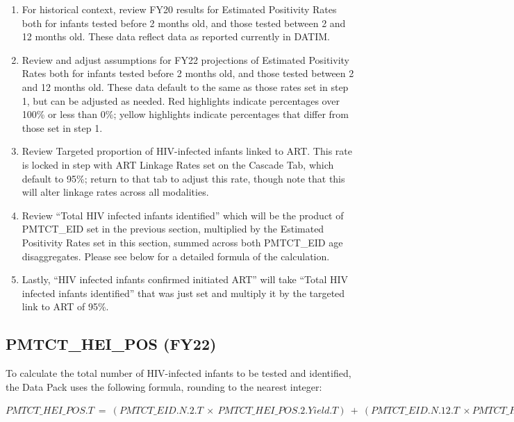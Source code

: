 \documentclass[
  openany]{book}
\begin{document}
\begin{enumerate}
\def\labelenumi{\arabic{enumi}.}
\item
  For historical context, review FY20 results for Estimated Positivity
  Rates both for infants tested before 2 months old, and those tested
  between 2 and 12 months old. These data reflect data as reported
  currently in DATIM.
\item
  Review and adjust assumptions for FY22 projections of Estimated
  Positivity Rates both for infants tested before 2 months old, and
  those tested between 2 and 12 months old. These data default to the
  same as those rates set in step 1, but can be adjusted as needed.
  Red highlights indicate percentages over 100\% or less than 0\%;
  yellow highlights indicate percentages that differ from those set in
  step 1.
\item
  Review Targeted proportion of HIV-infected infants linked to ART.
  This rate is locked in step with ART Linkage Rates set on the
  Cascade Tab, which default to 95\%; return to that tab to adjust this
  rate, though note that this will alter linkage rates across all
  modalities.
\item
  Review ``Total HIV infected infants identified'' which will be the
  product of PMTCT\_EID set in the previous section, multiplied by the
  Estimated Positivity Rates set in this section, summed across both
  PMTCT\_EID age disaggregates. Please see below for a detailed formula
  of the calculation.
\item
  Lastly, ``HIV infected infants confirmed initiated ART'' will take
  ``Total HIV infected infants identified'' that was just set and
  multiply it by the targeted link to ART of 95\%.
\end{enumerate}

\hypertarget{pmtct_hei_pos-fy22}{%
\subsection{PMTCT\_HEI\_POS (FY22)}\label{pmtct_hei_pos-fy22}}

To calculate the total number of HIV-infected infants to be tested and
identified, the Data Pack uses the following formula, rounding to the
nearest integer:

\begin{center} $PMTCT\_ HEI\_ POS.T\  = \ (PMTCT\_ EID.N.2.T\  \times \ PMTCT\_ HEI\_ POS.2.Yield.T)\  + \ (PMTCT\_ EID.N.12.T\  \times PMTCT\_ HEI\_ POS.12.Yield.T)\ $ \end{center}
\end{document}
